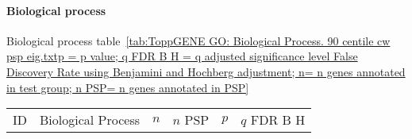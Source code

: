 \paragraph{Biological process}
Biological process table~\ref{tab:ToppGENE GO: Biological Process. 90 centile cw psp eig.txtp = p value; q FDR B H = q adjusted significance level False Discovery Rate using Benjamini and Hochberg adjustment; n= n genes annotated in test group; n PSP= n genes annotated in PSP}

  \begin{table}[ht]
\centering
\begin{adjustbox}{width=\textwidth}
\setlength{\extrarowheight}{2pt}
\begin{tabular}{@{}clllcl@{}}
  \toprule
  ID & Biological Process & $n$ & $n$ PSP & $p$ & $q$ FDR B H \\ 


\end{tabular}
\end{adjustbox}
\end{table}
